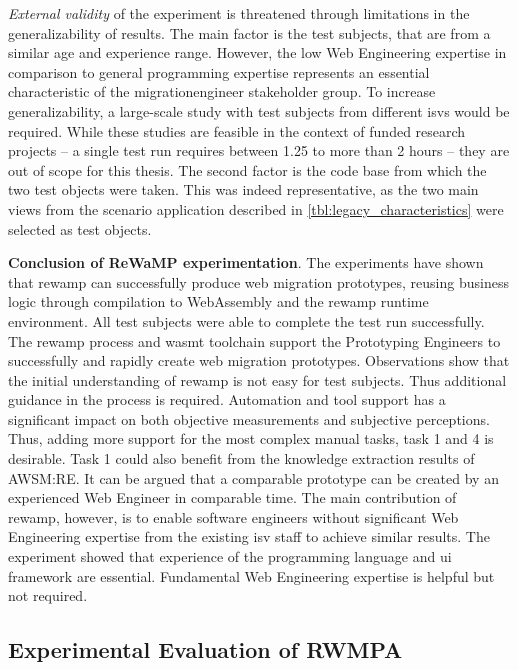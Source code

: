 \emph{External validity} of the experiment is threatened through limitations in the generalizability of results.
The main factor is the test subjects, that are from a similar age and experience range.
However, the low \gls{Web Engineering} expertise in comparison to general programming expertise represents an essential characteristic of the \gls{migrationengineer} stakeholder group.
To increase generalizability, a large-scale study with test subjects from different \glspl{isv} would be required.
While these studies are feasible in the context of funded research projects -- a single test run requires between 1.25 to more than 2 hours -- they are out of scope for this thesis.
The second factor is the  code base from which the two test objects were taken.
This was indeed representative, as the two main views from the scenario application described in \cref{tbl:legacy_characteristics} were selected as test objects.

\textbf{Conclusion of ReWaMP experimentation}.
The experiments have shown that \gls{rewamp} can successfully produce \glspl{web migration prototype}, reusing  business logic through compilation to WebAssembly and the \gls{rewamp} runtime environment.
All test subjects were able to complete the test run successfully.
The \gls{rewamp} process and \gls{wasmt} toolchain support the Prototyping Engineers to successfully and rapidly create \glspl{web migration prototype}.
Observations show that the initial understanding of \gls{rewamp} is not easy for test subjects.
Thus additional guidance in the process is required.
Automation and tool support has a significant impact on both objective measurements and subjective perceptions.
Thus, adding more support for the most complex manual tasks, task 1 and 4 is desirable.
Task 1 could also benefit from the knowledge extraction results of AWSM:RE.
It can be argued that a comparable prototype can be created by an experienced Web Engineer in comparable time.
The main contribution of \gls{rewamp}, however, is to enable software engineers without significant \gls{Web Engineering} expertise from the existing \gls{isv} staff to achieve similar results.
The experiment showed that experience of the  programming language and  \gls{ui} framework are essential.
Fundamental \gls{Web Engineering} expertise is helpful but not required.

\vspace{-10pt}
\hypertarget{sec:rwmpa.experiment}{%
\subsection{Experimental Evaluation of RWMPA}\label{sec:rwmpa.experiment}}
\vspace{10pt}

